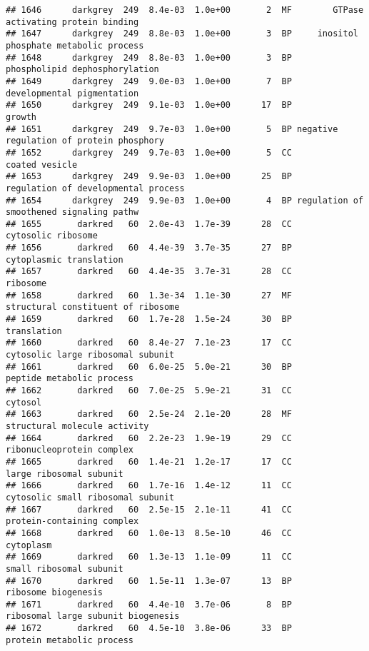 \documentclass[]{article}
\begin{document}
\begin{verbatim}
## 1646      darkgrey  249  8.4e-03  1.0e+00       2  MF        GTPase activating protein binding
## 1647      darkgrey  249  8.8e-03  1.0e+00       3  BP     inositol phosphate metabolic process
## 1648      darkgrey  249  8.8e-03  1.0e+00       3  BP           phospholipid dephosphorylation
## 1649      darkgrey  249  9.0e-03  1.0e+00       7  BP               developmental pigmentation
## 1650      darkgrey  249  9.1e-03  1.0e+00      17  BP                                   growth
## 1651      darkgrey  249  9.7e-03  1.0e+00       5  BP negative regulation of protein phosphory
## 1652      darkgrey  249  9.7e-03  1.0e+00       5  CC                           coated vesicle
## 1653      darkgrey  249  9.9e-03  1.0e+00      25  BP      regulation of developmental process
## 1654      darkgrey  249  9.9e-03  1.0e+00       4  BP regulation of smoothened signaling pathw
## 1655       darkred   60  2.0e-43  1.7e-39      28  CC                       cytosolic ribosome
## 1656       darkred   60  4.4e-39  3.7e-35      27  BP                  cytoplasmic translation
## 1657       darkred   60  4.4e-35  3.7e-31      28  CC                                 ribosome
## 1658       darkred   60  1.3e-34  1.1e-30      27  MF       structural constituent of ribosome
## 1659       darkred   60  1.7e-28  1.5e-24      30  BP                              translation
## 1660       darkred   60  8.4e-27  7.1e-23      17  CC        cytosolic large ribosomal subunit
## 1661       darkred   60  6.0e-25  5.0e-21      30  BP                peptide metabolic process
## 1662       darkred   60  7.0e-25  5.9e-21      31  CC                                  cytosol
## 1663       darkred   60  2.5e-24  2.1e-20      28  MF             structural molecule activity
## 1664       darkred   60  2.2e-23  1.9e-19      29  CC                ribonucleoprotein complex
## 1665       darkred   60  1.4e-21  1.2e-17      17  CC                  large ribosomal subunit
## 1666       darkred   60  1.7e-16  1.4e-12      11  CC        cytosolic small ribosomal subunit
## 1667       darkred   60  2.5e-15  2.1e-11      41  CC               protein-containing complex
## 1668       darkred   60  1.0e-13  8.5e-10      46  CC                                cytoplasm
## 1669       darkred   60  1.3e-13  1.1e-09      11  CC                  small ribosomal subunit
## 1670       darkred   60  1.5e-11  1.3e-07      13  BP                      ribosome biogenesis
## 1671       darkred   60  4.4e-10  3.7e-06       8  BP       ribosomal large subunit biogenesis
## 1672       darkred   60  4.5e-10  3.8e-06      33  BP                protein metabolic process

\end{verbatim}
\end{document}
